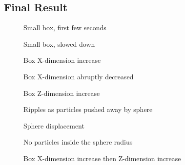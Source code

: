\documentclass[a4paper, 12pt]{article}
\newcommand{\wideimage}[2][]{%
  \makebox[\textwidth][c]{\texttt{[image: \#2]}}%
}
\begin{document}
    \subsection{Final Result}

    \begin{figure}[H]
        \wideimage[height=0.4\textheight]{smallBoxStart.png}
        \caption{Small box, first few seconds}
    \end{figure}

    \begin{figure}[H]
        \wideimage[height=0.4\textheight]{slowedDownSmallBox.png}
        \caption{Small box, slowed down}
    \end{figure}

    \begin{figure}[H]
        \wideimage[height=0.4\textheight]{xIncrease.png}
        \caption{Box X-dimension increase}
    \end{figure}

    \begin{figure}[H]
        \wideimage[height=0.4\textheight]{xDecrease.png}
        \caption{Box X-dimension abruptly decreased}
    \end{figure}
    
    \begin{figure}[H]
        \wideimage[height=0.4\textheight]{zIncrease.png}
        \caption{Box Z-dimension increase}
    \end{figure}

    \begin{figure}[H]
        \wideimage[height=0.4\textheight]{sphereRipples.png}
        \caption{Ripples as particles pushed away by sphere}
    \end{figure}

    \begin{figure}[H]
        \wideimage[height=0.4\textheight]{sphereDisplacement.png}
        \caption{Sphere displacement}
    \end{figure}

    \begin{figure}[H]
        \wideimage[height=0.4\textheight]{sphereDisplacementInside.png}
        \caption{No particles inside the sphere radius}
    \end{figure}

    \begin{figure}[H]
        \wideimage[height=0.4\textheight]{xIncreaseThenZIncrease.png}
        \caption{Box X-dimension increase then Z-dimension increase}
    \end{figure}
\end{document}
